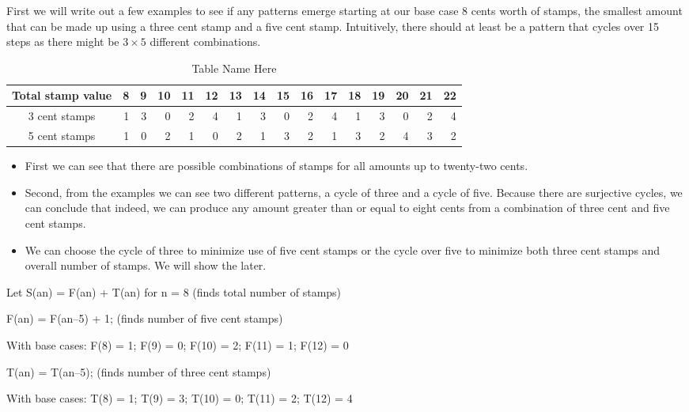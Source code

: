 \documentclass[12pt]{article}
\begin{document}

First we will write out a few examples to see if any patterns emerge starting at our base case 8 cents worth of stamps, the smallest amount that can be made up using a three cent stamp and a five cent stamp. Intuitively, there should at least be a pattern that cycles over 15 steps as there might be $3×5$ different combinations.

\begin{table}[h]
\caption{Table Name Here}
\centering
\begin{tabular}{c rrrrrrrrrrrrrrr}
\hline\hline
Total stamp value & 8 & 9 & 10 & 11 & 12 & 13 & 14 & 15 & 16 & 17 & 18 & 19 & 20 & 21 & 22} \\[0.5ex]
\hline
3 cent stamps & 1 & 3 & 0 & 2 & 4 & 1 & 3 & 0 & 2 & 4 & 1 & 3 & 0 & 2 & 4\\
5 cent stamps & 1 & 0 & 2 & 1 & 0 & 2 & 1 & 3 & 2 & 1 & 3 & 2 & 4 & 3 & 2\\ [1ex] %
\hline
\end{tabular}
\label{tab:hresult}
\end{table}

\begin{itemize}
  \item First we can see that there are possible combinations of stamps for all amounts up to twenty-two cents.
  \item Second, from the examples we can see two different patterns, a cycle of three and a cycle of five. Because there are surjective cycles, we can conclude that indeed, we can produce any amount greater than or equal to eight cents from a combination of three cent and five cent stamps.
  \item We can choose the cycle of three to minimize use of five cent stamps or the cycle over five to minimize both three cent stamps and overall number of stamps. We will show the later.
\end{itemize}

\noindent Let S(an) = F(an) + T(an) for n = 8  (finds total number of stamps)

\noindent F(an) = F(an–5) + 1; (finds number of five cent stamps)

With base cases: F(8) = 1; F(9) = 0; F(10) = 2; F(11) = 1; F(12) = 0

\noindent T(an) = T(an–5);       (finds number of three cent stamps)

With base cases: T(8) = 1; T(9) = 3; T(10) = 0; T(11) = 2; T(12) = 4

\end{document}
